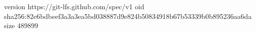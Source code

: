 version https://git-lfs.github.com/spec/v1
oid sha256:82e6bdbeef3a3a3ea5bd038887d9e824b50834918b67b53339b0b895236aa6da
size 489899
